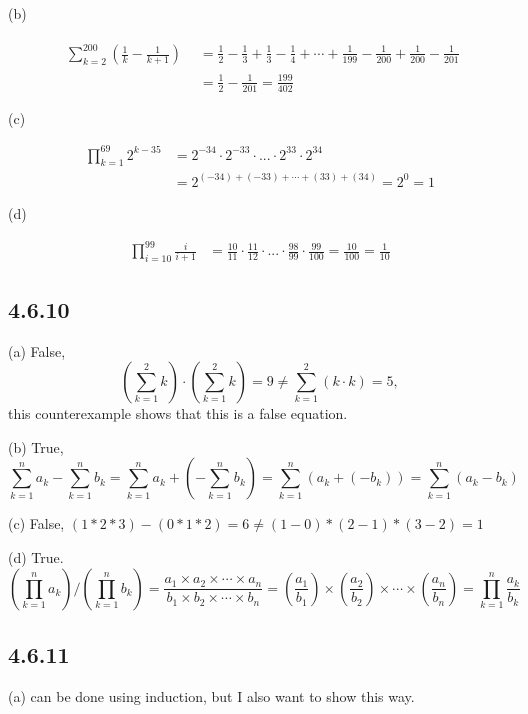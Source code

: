 \documentclass{article}
\begin{document}
(b)

\begin{align*}
    \begin{aligned}\sum_{k=2}^{200}\left(\frac{1}{k}-\frac{1}{k+1}\right)\end{aligned} &= \frac{1}{2} - \frac{1}{3} + \frac{1}{3} - \frac{1}{4} + \cdots + \frac{1}{199} - \frac{1}{200} + \frac{1}{200} - \frac{1}{201}\\
    &= \frac{1}{2} - \frac{1}{201} = \frac{199}{402}
\end{align*}

(c)

\begin{align*}
    \prod_{k=1}^{69}2^{k-35} &= 2^{-34} \cdot 2^{-33} \cdot ... \cdot 2^{33} \cdot 2^{34}\\
    &=2^{(-34)+(-33)+\cdots+(33)+(34)} = 2^0 = 1
\end{align*}

(d)

\begin{align*}
    \prod_{i=10}^{99}\frac i{i+1} &= \frac{10}{11}\cdot\frac{11}{12}\cdot...\cdot\frac{98}{99}\cdot\frac{99}{100}=\frac{10}{100}=\frac{1}{10}
\end{align*}

\subsection*{4.6.10}

(a) False, $$\left(\sum_{k=1}^2 k\right)\cdot\left(\sum_{k=1}^2 k\right)=9\neq\sum_{k=1}^2(k\cdot k)=5,$$ this counterexample shows that this is a false equation.

(b) True, $$\sum_{k=1}^na_k-\sum_{k=1}^nb_k = \sum_{k=1}^na_k+(-\sum_{k=1}^nb_k) =\sum_{k=1}^n(a_k+(-b_k))=\sum_{k=1}^n(a_k-b_k)$$

(c) False, $(1*2*3)-(0*1*2)=6\neq(1-0)*(2-1)*(3-2)=1$

(d) True. $$\left(\prod_{k=1}^na_k\right)/\left(\prod_{k=1}^nb_k\right)= \frac{a_1\times a_2 \times \cdots\times a_n}{b_1\times b_2 \times \cdots \times b_n}=(\frac{a_1}{b_1})\times(\frac{a_2}{b_2})\times\cdots\times(\frac{a_n}{b_n}) = \prod_{k=1}^n\frac{a_k}{b_k}$$

\subsection*{4.6.11}


(a) can be done using induction, but I also want to show this way.
\end{document}
